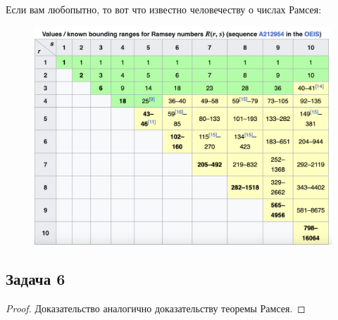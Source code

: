 Если вам любопытно, то вот что известно человечеству о числах Рамсея:

\begin{figure}[H]
    \centering
    \includegraphics[width=0.75\linewidth]{sem09_known_ramsey_numbers.png}
\end{figure}

\subsection{Задача 6}

\begin{proof}
    Доказательство аналогично доказательству теоремы Рамсея. 

    
\end{proof}